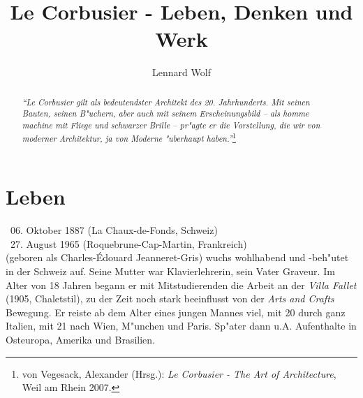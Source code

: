 \documentclass[a4paper]{tufte-handout}
\title{Le Corbusier - Leben, Denken und Werk}%
\author[Lennard Wolf]{Lennard Wolf}
\date{ } %
\begin{document}
\maketitle%


\begin{abstract}
\noindent
\emph{"`Le Corbusier gilt als bedeutendster Architekt des 20. Jahrhunderts. Mit seinen Bauten, seinen B"uchern, aber auch mit seinem Erscheinungsbild -- als \emph{homme machine} mit Fliege und schwarzer Brille -- pr"agte er die Vorstellung, die wir von moderner Architektur, ja von Moderne "uberhaupt haben."'}\footnote{von Vegesack, Alexander (Hrsg.): \emph{Le Corbusier - The Art of Architecture}, Weil am Rhein 2007.}
\end{abstract}


\section{Leben}\label{sec:leben}

\textasteriskcentered ~06. Oktober 1887 (La Chaux-de-Fonds, Schweiz)\\
\noindent \textdagger~27. August 1965 (Roquebrune-Cap-Martin, Frankreich)\\

 (geboren als Charles-\'Edouard Jeanneret-Gris) wuchs wohlhabend und -beh"utet in der Schweiz auf. Seine Mutter war Klavierlehrerin, sein Vater Graveur. Im Alter von 18 Jahren begann er mit Mitstudierenden die Arbeit an der \emph{Villa Fallet} (1905, Chaletstil), zu der Zeit noch stark beeinflusst von der \emph{Arts and Crafts} Bewegung. Er reiste ab dem Alter eines jungen Mannes viel, mit 20 durch ganz Italien, mit 21 nach Wien, M"unchen und Paris. Sp"ater dann u.A. Aufenthalte in Osteuropa, Amerika und Brasilien.
\end{document}
